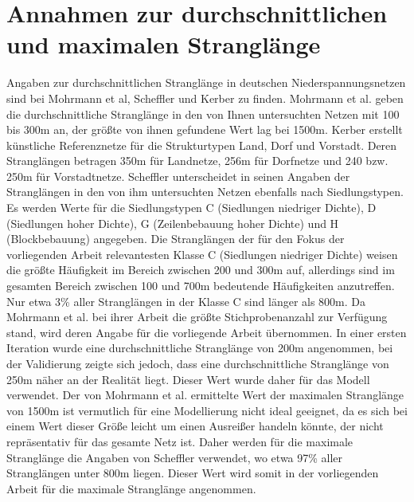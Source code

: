 \documentclass[11pt]{scrreprt}
\begin{document}
\chapter{Annahmen zur durchschnittlichen und maximalen Stranglänge}
\label{sec:Annahmen zur durchschnittlichen und maximalen Stranglänge}

Angaben zur durchschnittlichen Stranglänge in deutschen Niederspannungsnetzen sind bei Mohrmann et al, Scheffler und Kerber zu finden. Mohrmann et al. geben die durchschnittliche Stranglänge in den von Ihnen untersuchten Netzen mit 100 bis 300m an, der größte von ihnen gefundene Wert lag bei 1500m. 
Kerber erstellt künstliche Referenznetze für die Strukturtypen Land, Dorf und Vorstadt. Deren Stranglängen betragen 350m für Landnetze, 256m für Dorfnetze und 240 bzw. 250m für Vorstadtnetze.
Scheffler unterscheidet in seinen Angaben der Stranglängen in den von ihm untersuchten Netzen ebenfalls nach Siedlungstypen. Es werden Werte für die Siedlungstypen C (Siedlungen niedriger Dichte), D (Siedlungen hoher Dichte), G (Zeilenbebauung hoher Dichte) und H (Blockbebauung) angegeben. Die Stranglängen der für den Fokus der vorliegenden Arbeit relevantesten Klasse C (Siedlungen niedriger Dichte) weisen die größte Häufigkeit im Bereich zwischen 200 und 300m auf, allerdings sind im gesamten Bereich zwischen 100 und 700m bedeutende Häufigkeiten anzutreffen. Nur etwa 3\% aller Stranglängen in der Klasse C sind länger als 800m.
Da Mohrmann et al. bei ihrer Arbeit die größte Stichprobenanzahl zur Verfügung stand, wird deren Angabe für die vorliegende Arbeit übernommen. In einer ersten Iteration wurde eine durchschnittliche Stranglänge von 200m angenommen, bei der Validierung zeigte sich jedoch, dass eine durchschnittliche Stranglänge von 250m näher an der Realität liegt. Dieser Wert wurde daher für das Modell verwendet. Der von Mohrmann et al. ermittelte Wert der maximalen Stranglänge von 1500m ist vermutlich für eine Modellierung nicht ideal geeignet, da es sich bei einem Wert dieser Größe leicht um einen Ausreißer handeln könnte, der nicht repräsentativ für das gesamte Netz ist. Daher werden für die maximale Stranglänge die Angaben von Scheffler verwendet, wo  etwa 97\% aller Stranglängen unter 800m liegen. Dieser Wert wird somit in der vorliegenden Arbeit für die maximale Stranglänge angenommen.
\end{document}
